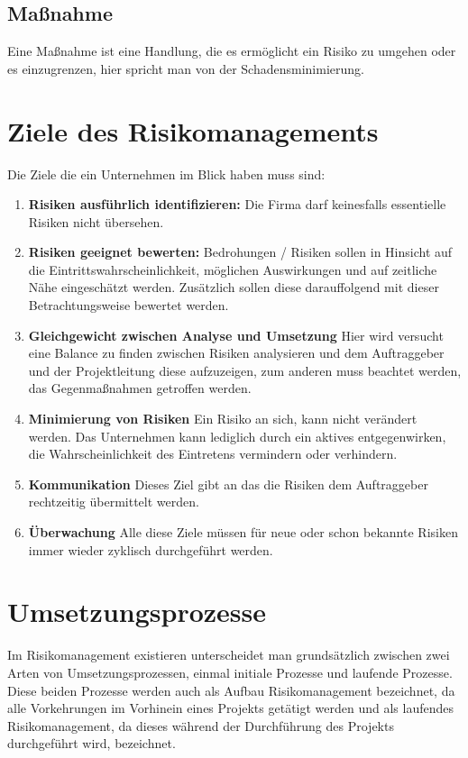 \subsection{Maßnahme}
Eine Maßnahme ist eine Handlung, die es ermöglicht ein Risiko zu umgehen oder es einzugrenzen, hier spricht man von der Schadensminimierung. 

\section{Ziele des Risikomanagements}
Die Ziele die ein Unternehmen im Blick haben muss sind:
\begin{enumerate}
	\item \textbf{Risiken ausführlich identifizieren:} Die Firma darf keinesfalls essentielle Risiken nicht übersehen.
	\item \textbf{Risiken geeignet bewerten:} Bedrohungen / Risiken sollen in Hinsicht auf die Eintrittswahrscheinlichkeit, möglichen Auswirkungen und auf zeitliche Nähe eingeschätzt werden. Zusätzlich sollen diese darauffolgend mit dieser Betrachtungsweise bewertet werden.
	\item \textbf{Gleichgewicht zwischen Analyse und Umsetzung} Hier wird versucht eine Balance zu finden zwischen Risiken analysieren und dem Auftraggeber und der Projektleitung diese aufzuzeigen, zum anderen muss beachtet werden, das Gegenmaßnahmen getroffen werden.
	\item \textbf{Minimierung von Risiken} Ein Risiko an sich, kann nicht verändert werden. Das Unternehmen kann lediglich durch ein aktives entgegenwirken, die Wahrscheinlichkeit des Eintretens vermindern oder verhindern.
	\item \textbf{Kommunikation} Dieses Ziel gibt an das die Risiken dem Auftraggeber rechtzeitig übermittelt werden.
	\item \textbf{Überwachung} Alle diese Ziele müssen für neue oder schon bekannte Risiken immer wieder zyklisch durchgeführt werden. 
\end{enumerate}

\section{Umsetzungsprozesse}
Im Risikomanagement existieren unterscheidet man grundsätzlich zwischen zwei Arten von Umsetzungsprozessen, einmal initiale Prozesse und laufende Prozesse.
Diese beiden Prozesse werden auch als Aufbau Risikomanagement bezeichnet, da alle Vorkehrungen im Vorhinein eines Projekts getätigt werden und als laufendes Risikomanagement, da dieses während der Durchführung des Projekts durchgeführt wird, bezeichnet.

